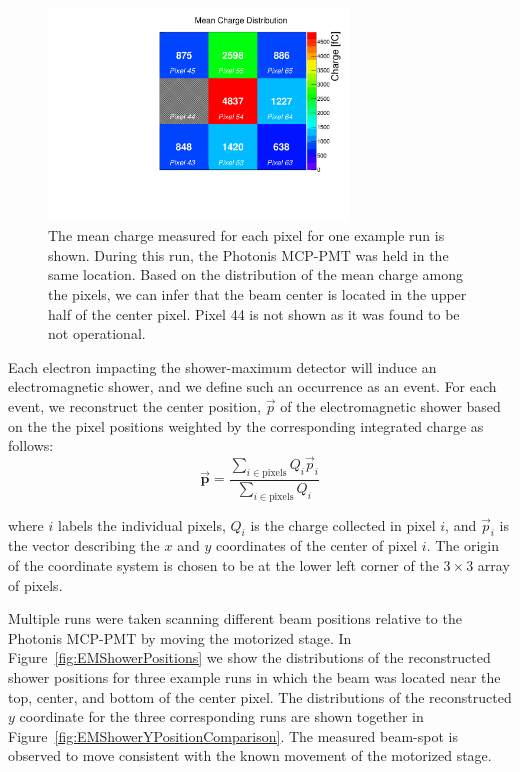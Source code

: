 \documentclass[12pt]{article}
\begin{document}
\begin{figure}[htbp] 
\centering
\includegraphics[width=8cm]{Images/exavint/exintrun30.pdf} 
\caption{\small The mean charge measured for each pixel for one example run is shown. During this run, the Photonis MCP-PMT was held in the same location. Based on the distribution
of the mean charge among the pixels, we can infer that the beam center is
located in the upper half of the center pixel. Pixel 44 is not shown as it was
found to be not operational. } 
\label{fig:exavint} 
\end{figure} 

Each electron impacting the shower-maximum detector will induce an
electromagnetic shower, and we define such an occurrence as an event. For each
event, we reconstruct the center position, $\vec{p}$ of the electromagnetic
shower based on the the pixel positions weighted by the corresponding integrated
charge as follows: 
\begin{equation} 
 \vec{\mathbf{{p}}} =
\frac{\sum_{i\in\mathrm{pixels}} Q_{i} \vec{p}_i} {\sum_{i\in\mathrm{pixels}}
Q_{i}} 
\end{equation} 

where $i$ labels the individual pixels, $Q_{i}$ is the charge collected in pixel
$i$, and $\vec{p}_{i}$ is the vector describing the $x$ and $y$ coordinates of
the center of pixel $i$. The origin of the coordinate system is chosen to be at
the lower left corner of the $3\times3$ array of pixels.

Multiple runs were taken scanning different beam positions relative to the
Photonis MCP-PMT by moving the motorized stage. In
Figure~\ref{fig:EMShowerPositions} we show the distributions of the
reconstructed shower positions for three example runs in which the beam was
located near the top, center, and bottom of the center pixel. The distributions
of the reconstructed $y$ coordinate for the three corresponding runs are shown
together in Figure~\ref{fig:EMShowerYPositionComparison}. The measured beam-spot
is observed to move consistent with the known movement of the motorized stage.
\end{document}
